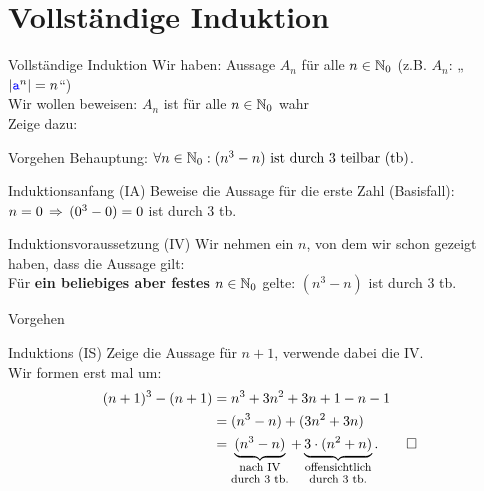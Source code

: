 \section{Vollständige Induktion}

\morescalingdelimiters

\begin{frame}{Vollständige Induktion}
	Wir haben: Aussage $A_n$ für alle $n \in \mathbb{N}_0$ (z.B. $A_n$: „$\left\lvert \hbox{\textcolor{blue}{\texttt{a}}}^n \right\rvert = n$“) \\
	Wir wollen beweisen: $A_n$ ist für alle $n \in \mathbb{N}_0$ wahr \\[0.5em]
	\pause
	Zeige dazu: 
\end{frame}

\begin{frame}{Vorgehen}
	Behauptung: $\forall n \in \mathbb{N}_0: (n^3 - n) \text{ ist durch 3 teilbar (tb)}$.
	\pause
	\begin{block}{Induktionsanfang (IA)}
		Beweise die Aussage für die erste Zahl (Basisfall):\\
		$n = 0 \impl (0^3 - 0) = 0$ ist durch 3 tb. \; \textbf{\checked}
	\end{block}
	\pause
	\begin{block}{Induktionsvoraussetzung (IV)}
		Wir nehmen ein $n$, von dem wir schon gezeigt haben, dass die Aussage gilt:\\
		Für \textbf{ein beliebiges aber festes} $n \in \mathbb{N}_0$ gelte: $(n^3 - n)$ ist durch 3 tb. 
	\end{block}
\end{frame}

\begin{frame}{Vorgehen}
	\begin{block}{Induktions (IS)}
		Zeige die Aussage für $n+1$, verwende dabei die IV.\\
		\pause
		\medskip
		Wir formen erst mal um:
		\begin{align*}
			(n+1)^3 - (n+1) &= n^3 + 3n^2 + 3n + 1 - n - 1 \\
			&= (n^3 - n) + (3n^2 + 3n) \\
			&= \underbrace{(n^3-n)}_{\shortstack{\footnotesize nach IV \\ \footnotesize durch 3 tb.}} + \underbrace{3 \* (n^2 + n)}_{\shortstack{\footnotesize offensichtlich \\ \footnotesize durch 3 tb.}}. \qed
		\end{align*}
	\end{block}

\end{frame}

